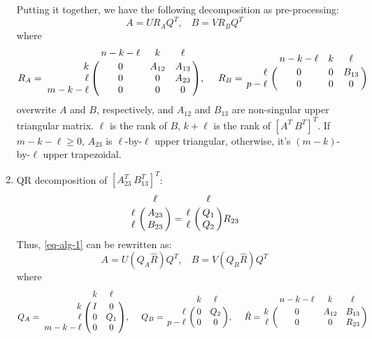 \begin{enumerate}
            Putting it together, we have the following decomposition as pre-processing: 
            \begin{equation} \label{eq-alg-1}
                A = UR_{A}Q^{T},\ \ \ \ B = VR_{B}Q^{T}
            \end{equation}
            where
            \begin{displaymath}
                R_{A} = \bordermatrix{ & n-k-\ell & k & \ell \cr
                \hfill k & 0 & A_{12} & A_{13} \cr
                \hfill \ell & 0 & 0 & A_{23} \cr
                \hfill m-k-\ell & 0 & 0 & 0}, \  \ \ \
                R_{B} = \bordermatrix{ & n-k-\ell & k & \ell   \cr
                \hfill \ell & 0 & 0 & B_{13}\cr
                \hfill p-\ell & 0 & 0 & 0}
            \end{displaymath}
            overwrite $A$ and $B$, respectively, and $A_{12}$ and $B_{13}$ are non-singular upper triangular matrix. $\ell$ is the rank of $B$, $k+\ell$ is the rank of $[A^T \ B^T]^T$. If $m-k-\ell \geq 0$, $A_{23}$ is $\ell$-by-$\ell$ upper triangular, otherwise, it's $(m-k)$-by-$\ell$ upper trapezoidal. 
        
        \item QR decomposition of $[A_{23}^{T} \ B_{13}^{T}]^T$:
            \begin{displaymath}
                    \bordermatrix{ & \ell  \cr
                        \hfill \ell & A_{23}  \cr
                        \hfill \ell & B_{23} \cr} = 
                    \bordermatrix{ & \ell  \cr
                        \hfill \ell & Q_{1}  \cr
                        \hfill \ell & Q_{2} \cr}R_{23}   
            \end{displaymath}
            Thus, \eqref {eq-alg-1} can be rewritten as:
            \begin{equation} \label{eq-alg-2}
                A = U(Q_{A}\hat{R})Q^{T}, \ \ \ \ B = V(Q_{B}\hat{R})Q^{T}
            \end{equation}
            where 
            \begin{displaymath}
                Q_{A} = \bordermatrix{ & k & \ell \cr
                \hfill k & I & 0 \cr
                \hfill \ell & 0 & Q_1 \cr
                \hfill m-k-\ell & 0 & 0}, \  \ \ \
                Q_{B} = \bordermatrix{ & k & \ell   \cr
                \hfill \ell & 0 & Q_2\cr
                \hfill p-\ell & 0 & 0}, \ \ \ \
                \hat{R} = \bordermatrix{ & n-k-\ell & k & \ell \cr
                \hfill k & 0 & A_{12} & B_{13} \cr
                \hfill \ell & 0 & 0 & R_{23}}
            \end{displaymath}
        

\end{enumerate}
